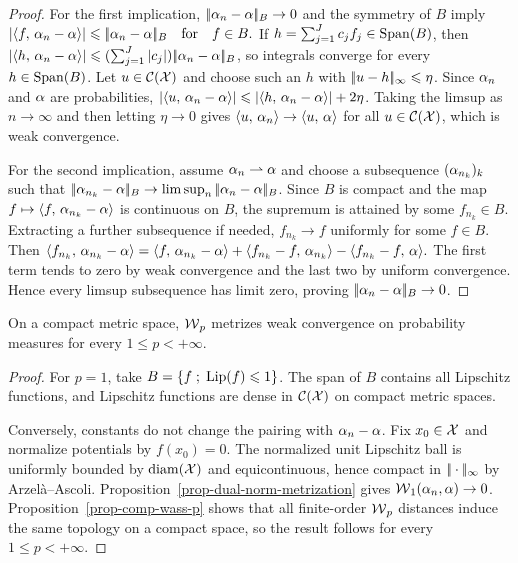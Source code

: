 \begin{proof}
For the first implication, $|\!| \alpha_n-\alpha |\!|_B\to0$ and the symmetry of $B$ imply
\(\left\lvert\langle f,\,\alpha_n-\alpha\rangle\right\rvert\leqslant |\!| \alpha_n-\alpha |\!|_B \quad \text{for} \quad f\in B.\)
If $h=\sum_{j=1}^J c_j f_j\in\operatorname{Span}(B)$, then
$\left\lvert\langle h,\,\alpha_n-\alpha\rangle\right\rvert
\leqslant(\sum_{j=1}^J|c_j|)|\!| \alpha_n-\alpha |\!|_B$,
so integrals converge for every $h\in\operatorname{Span}(B)$. Let $u\in\mathcal{C}(\mathcal{X})$ and choose such an $h$ with $|\!| u-h |\!|_\infty\leqslant\eta$. Since $\alpha_n$ and $\alpha$ are probabilities,
$\left\lvert\langle u,\,\alpha_n-\alpha\rangle\right\rvert
\leqslant\left\lvert\langle h,\,\alpha_n-\alpha\rangle\right\rvert+2\eta$.
Taking the limsup as $n\to\infty$ and then letting $\eta\to0$ gives $\langle u,\,\alpha_n\rangle\to\langle u,\,\alpha\rangle$ for all $u\in\mathcal{C}(\mathcal{X})$, which is weak convergence.

For the second implication, assume $\alpha_n\rightharpoonup\alpha$ and choose a subsequence $(\alpha_{n_k})_k$ such that $|\!| \alpha_{n_k}-\alpha |\!|_B\to\limsup_n|\!| \alpha_n-\alpha |\!|_B$. Since $B$ is compact and the map $f\mapsto\langle f,\,\alpha_{n_k}-\alpha\rangle$ is continuous on $B$, the supremum is attained by some $f_{n_k}\in B$. Extracting a further subsequence if needed, $f_{n_k}\to f$ uniformly for some $f\in B$. Then
\(\langle f_{n_k},\,\alpha_{n_k}-\alpha\rangle = \langle f,\,\alpha_{n_k}-\alpha\rangle +\langle f_{n_k}-f,\,\alpha_{n_k}\rangle -\langle f_{n_k}-f,\,\alpha\rangle.\)
The first term tends to zero by weak convergence and the last two by uniform convergence. Hence every limsup subsequence has limit zero, proving $|\!| \alpha_n-\alpha |\!|_B\to0$.
\end{proof}
\begin{cor}\label{cor-topol-wass}
On a compact metric space, $\operatorname{\mathcal{W}}_p$ metrizes weak convergence on probability measures for every $1\leq p<+\infty$.
\end{cor}
\begin{proof}
For $p=1$, take $B=\left\{ f \;;\; \operatorname{Lip}(f)\leqslant1 \right\}$. The span of $B$ contains all Lipschitz functions, and Lipschitz functions are dense in $\mathcal{C}(\mathcal{X})$ on compact metric spaces.

Conversely, constants do not change the pairing with $\alpha_n-\alpha$. Fix $x_0\in\mathcal{X}$ and normalize potentials by $f(x_0)=0$. The normalized unit Lipschitz ball is uniformly bounded by $\mathrm{diam}(\mathcal{X})$ and equicontinuous, hence compact in $|\!| \cdot |\!|_\infty$ by Arzel\`a--Ascoli. Proposition~\ref{prop-dual-norm-metrization} gives $\operatorname{\mathcal{W}}_1(\alpha_n,\alpha)\to0$. Proposition~\ref{prop-comp-wass-p} shows that all finite-order $\operatorname{\mathcal{W}}_p$ distances induce the same topology on a compact space, so the result follows for every $1\leq p<+\infty$.
\end{proof}
